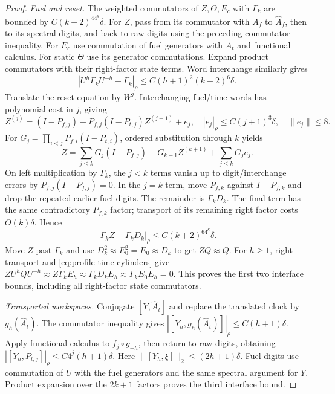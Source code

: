 \begin{proof}
\par\smallskip\noindent\textit{Fuel and reset.}\quad
The weighted commutators of $Z,\Theta,E_c$ with $\Gamma_k$ are bounded by $C(k+2)^44^k\delta$. For $Z$, pass from its commutator with $A_f$ to $\widehat A_f$, then to its spectral digits, and back to raw digits using the preceding commutator inequality. For $E_c$ use commutation of fuel generators with $A_t$ and functional calculus. For static $\Theta$ use its generator commutations. Expand product commutators with their right-factor state terms. Word interchange similarly gives
\[
 |U^h\Gamma_kU^{-h}-\Gamma_k|_\rho\le C(h+1)^2(k+2)^6\delta.
\]
Translate the reset equation by $W^j$. Interchanging fuel/time words has polynomial cost in $j$, giving
\[
 Z^{(j)}=(I-P_{f,j})+P_{f,j}(I-P_{t,j})Z^{(j+1)}+e_j,
 \quad |e_j|_\rho\le C(j+1)^3\delta,\quad\|e_j\|\le8.
\]
For $G_j=\prod_{i<j}P_{f,i}(I-P_{t,i})$, ordered substitution through $k$ yields
\[
 Z=\sum_{j\le k}G_j(I-P_{f,j})+G_{k+1}Z^{(k+1)}+\sum_{j\le k}G_je_j.
\]
On left multiplication by $\Gamma_k$, the $j<k$ terms vanish up to digit/interchange errors by $P_{f,j}(I-P_{f,j})=0$. In the $j=k$ term, move $P_{f,k}$ against $I-P_{f,k}$ and drop the repeated earlier fuel digits. The remainder is $\Gamma_kD_k$. The final term has the same contradictory $P_{f,k}$ factor; transport of its remaining right factor costs $O(k)\delta$. Hence
\begin{equation}\label{eq:profile-reset-local}
 |\Gamma_kZ-\Gamma_kD_k|_\rho\le C(k+2)^64^k\delta.
\end{equation}
Move $Z$ past $\Gamma_k$ and use $D_k^2\approx E_0^2=E_0\approx D_k$ to get $ZQ\approx Q$. For $h\ge1$, right transport and \eqref{eq:profile-time-cylinders} give $ZU^hQU^{-h}\approx Z\Gamma_kE_h\approx\Gamma_kD_kE_h\approx\Gamma_kE_0E_h=0$. This proves the first two interface bounds, including all right-factor state commutators.

\par\smallskip\noindent\textit{Transported workspaces.}\quad
Conjugate $[Y,\widehat A_t]$ and replace the translated clock by $g_h(\widehat A_t)$. The commutator inequality gives $|[Y_h,g_h(\widehat A_t)]|_\rho\le C(h+1)\delta$. Apply functional calculus to $f_j\circ g_{-h}$, then return to raw digits, obtaining $|[Y_h,P_{t,j}]|_\rho\le C4^j(h+1)\delta$. Here $\|[Y_h,\xi]\|_2\le(2h+1)\delta$. Fuel digits use commutation of $U$ with the fuel generators and the same spectral argument for $Y$. Product expansion over the $2k+1$ factors proves the third interface bound.


\end{proof}
